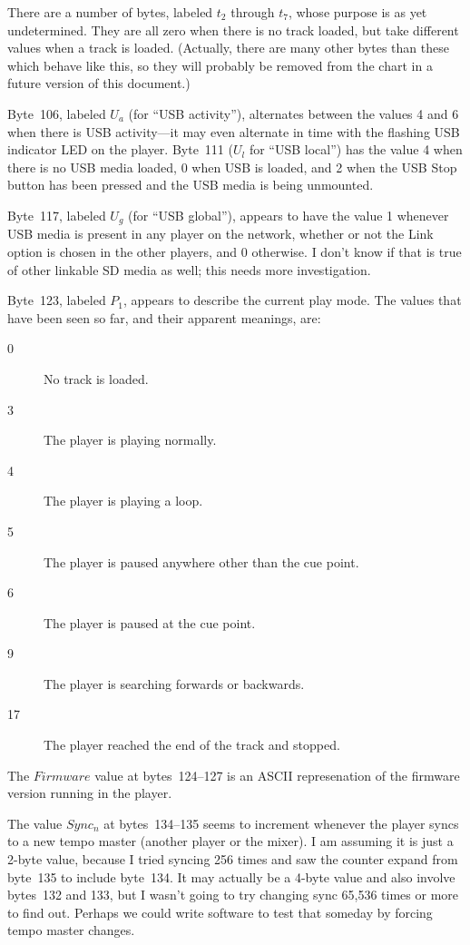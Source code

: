 \documentclass[11pt]{article}
\begin{document}
There are a number of bytes, labeled $t_2$ through $t_7$, whose
purpose is as yet undetermined. They are all zero when there is no
track loaded, but take different values when a track is loaded.
(Actually, there are many other bytes than these which behave like
this, so they will probably be removed from the chart in a future
version of this document.)

Byte~106, labeled $U_a$ (for ``USB activity''), alternates between the
values 4 and 6 when there is USB activity---it may even alternate in
time with the flashing USB indicator LED on the player. Byte~111
($U_l$ for ``USB local'') has the value 4 when there is no USB media
loaded, 0 when USB is loaded, and 2 when the USB Stop button has been
pressed and the USB media is being unmounted.

Byte~117, labeled $U_g$ (for ``USB global''), appears to have the
value 1 whenever USB media is present in any player on the network,
whether or not the Link option is chosen in the other players, and 0
otherwise. I don't know if that is true of other linkable SD media as
well; this needs more investigation.

Byte~123, labeled $P_1$, appears to describe the current play mode.
The values that have been seen so far, and their apparent meanings,
are:
\begin{description}
\item[0] No track is loaded.
\item[3] The player is playing normally.
\item[4] The player is playing a loop.
\item[5] The player is paused anywhere other than the cue point.
\item[6] The player is paused at the cue point.
\item[9] The player is searching forwards or backwards.
\item[17] The player reached the end of the track and stopped.
\end{description}

The $Firmware$ value at bytes~124--127 is an ASCII represenation of the
firmware version running in the player.

The value $Sync_n$ at bytes~134--135 seems to increment whenever the
player syncs to a new tempo master (another player or the mixer). I am
assuming it is just a 2-byte value, because I tried syncing 256 times
and saw the counter expand from byte~135 to include byte~134. It may
actually be a 4-byte value and also involve bytes~132 and 133, but I
wasn't going to try changing sync 65,536 times or more to find out.
Perhaps we could write software to test that someday by forcing tempo
master changes.
\end{document}
